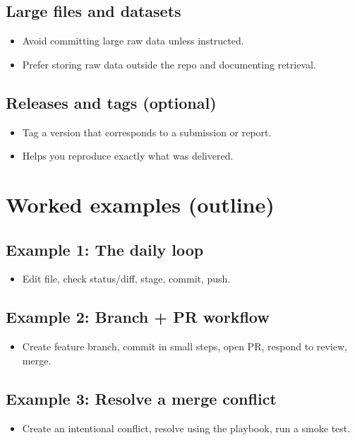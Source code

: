 \subsection{Large files and datasets}
\begin{itemize}
\item Avoid committing large raw data unless instructed.
\item Prefer storing raw data outside the repo and documenting retrieval.
\end{itemize}

\subsection{Releases and tags (optional)}
\begin{itemize}
\item Tag a version that corresponds to a submission or report.
\item Helps you reproduce exactly what was delivered.
\end{itemize}

\section{Worked examples (outline)}
\subsection{Example 1: The daily loop}
\begin{itemize}
\item Edit file, check status/diff, stage, commit, push.
\end{itemize}

\subsection{Example 2: Branch + PR workflow}
\begin{itemize}
\item Create feature branch, commit in small steps, open PR, respond to review, merge.
\end{itemize}

\subsection{Example 3: Resolve a merge conflict}
\begin{itemize}
\item Create an intentional conflict, resolve using the playbook, run a smoke test.
\end{itemize}

